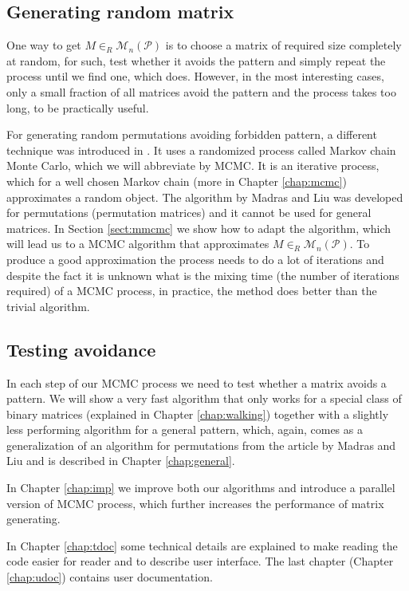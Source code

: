 \subsection*{Generating random matrix}
One way to get $M\in_R\mathcal{M}_n(\mathcal{P})$ is to choose a matrix of required size completely at random, for such, test whether it avoids the pattern and simply repeat the process until we find one, which does. However, in the most interesting cases, only a small fraction of all matrices avoid the pattern and the process takes too long, to be practically useful.

For generating random permutations avoiding forbidden pattern, a different technique was introduced in \cite{MadrasLiu-mcmc}. It uses a randomized process called Markov chain Monte Carlo, which we will abbreviate by MCMC. It is an iterative process, which for a well chosen Markov chain (more in Chapter \ref{chap:mcmc}) approximates a random object. The algorithm by Madras and Liu was developed for permutations (permutation matrices) and it cannot be used for general matrices. In Section \ref{sect:mmcmc} we show how to adapt the algorithm, which will lead us to a MCMC algorithm that approximates $M\in_R\mathcal{M}_n(\mathcal{P})$. To produce a good approximation the process needs to do a lot of iterations and despite the fact it is unknown what is the mixing time (the number of iterations required) of a MCMC process, in practice, the method does better than the trivial algorithm.
\subsection*{Testing avoidance}
In each step of our MCMC process we need to test whether a matrix avoids a pattern. We will show a very fast algorithm that only works for a special class of binary matrices (explained in Chapter \ref{chap:walking}) together with a slightly less performing algorithm for a general pattern, which, again, comes as a generalization of an algorithm for permutations from the article by Madras and Liu and is described in Chapter \ref{chap:general}.

In Chapter \ref{chap:imp} we improve both our algorithms and introduce a parallel version of MCMC process, which further increases the performance of matrix generating.

In Chapter \ref{chap:tdoc} some technical details are explained to make reading the code easier for reader and to describe user interface. The last chapter (Chapter \ref{chap:udoc}) contains user documentation.

